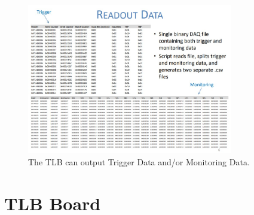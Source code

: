 \begin{figure}[htbp!] 
\centering    
\includegraphics[width=0.8\textwidth]{ChapterDAQ/Figs/GeneralDAQ/ReadoutData.jpg}
\caption[TLB Trigger and Monitoring Data output]{The TLB can output Trigger Data and/or  Monitoring Data.}
\label{fig:ReadoutData}
\end{figure}


\section{TLB Board}


